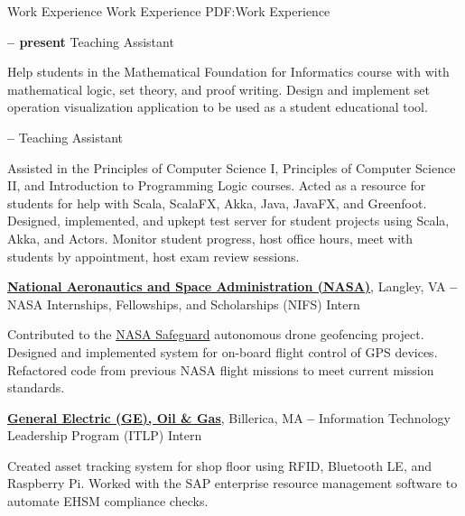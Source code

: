 \Section
{Work Experience}
{Work Experience}
{PDF:Work Experience}

\Entry
\UMassTitle
\dotfill
\textbf{ -- present}
\SubEntry
\Gap
Teaching Assistant
\begin{Detail}
    \SubBulletItem
    Help students in the Mathematical Foundation for Informatics course with with mathematical logic, set theory, and proof writing.
    \SubBulletItem
    Design and implement set operation visualization application to be used as a student educational tool.
\end{Detail}

\BigGap
\Entry
\TrinityTitle
\dotfill
\textbf{ -- }
\SubEntry
\Gap
Teaching Assistant
\begin{Detail}
    \SubBulletItem
    Assisted in the Principles of Computer Science I, Principles of Computer Science II, and Introduction to Programming Logic courses.
    \SubBulletItem
    Acted as a resource for students for help with Scala, ScalaFX, Akka, Java, JavaFX, and Greenfoot.
    \SubBulletItem
    Designed, implemented, and upkept test server for student projects using Scala, Akka, and Actors.
    \SubBulletItem
    Monitor student progress, host office hours, meet with students by appointment, host exam review sessions.
\end{Detail}

\BigGap
\Entry
\href{https://www.nasa.gov/}
{\textbf{National Aeronautics and Space Administration (NASA)}},
Langley, VA
\dotfill
\textbf{ -- }
\SubEntry
\Gap
NASA Internships, Fellowships, and Scholarships (NIFS) Intern
\begin{Detail}
    \SubBulletItem
    Contributed to the \href{https://www.nasa.gov/langley/business/feature/nasa-langley-s-safeguard-system-for-uavs-aims-to-take-flight}{NASA Safeguard} autonomous drone geofencing project.
    \SubBulletItem
    Designed and implemented system for on-board flight control of GPS devices.
    \SubBulletItem
    Refactored code from previous NASA flight missions to meet current mission standards.
\end{Detail}

\BigGap
\Entry
\href{https://www.ge.com/}
{\textbf{General Electric (GE), Oil \& Gas}},
Billerica, MA
\dotfill
\textbf{ --
}
\SubEntry
\Gap
Information Technology Leadership Program (ITLP) Intern
\begin{Detail}
    \SubBulletItem
    Created asset tracking system for shop floor using RFID, Bluetooth LE, and Raspberry Pi.
    \SubBulletItem
    Worked with the SAP enterprise resource management software to automate EHSM compliance checks.
\end{Detail}
